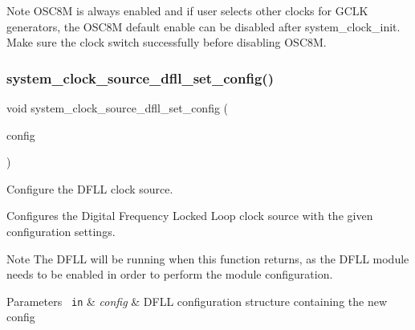 \begin{DoxyNote}{Note}
O\+S\+C8M is always enabled and if user selects other clocks for G\+C\+LK generators, the O\+S\+C8M default enable can be disabled after system\+\_\+clock\+\_\+init. Make sure the clock switch successfully before disabling O\+S\+C8M. 
\end{DoxyNote}
\mbox{\label{group__asfdoc__sam0__system__clock__group_gaa15073d0d4bd347bf8855ac20fd1b93c}} 
\subsubsection{\texorpdfstring{system\_clock\_source\_dfll\_set\_config()}{system\_clock\_source\_dfll\_set\_config()}}
{\footnotesize\ttfamily void system\+\_\+clock\+\_\+source\+\_\+dfll\+\_\+set\+\_\+config (\begin{DoxyParamCaption}\item[{struct \mbox{\hyperlink{structsystem__clock__source__dfll__config}{system\+\_\+clock\+\_\+source\+\_\+dfll\+\_\+config}} $\ast$const}]{config }\end{DoxyParamCaption})}



Configure the D\+F\+LL clock source. 

Configures the Digital Frequency Locked Loop clock source with the given configuration settings.

\begin{DoxyNote}{Note}
The D\+F\+LL will be running when this function returns, as the D\+F\+LL module needs to be enabled in order to perform the module configuration.
\end{DoxyNote}

\begin{DoxyParams}[1]{Parameters}
\mbox{\texttt{ in}}  & {\em config} & D\+F\+LL configuration structure containing the new config \\
\hline
\end{DoxyParams}
\mbox{\label{group__asfdoc__sam0__system__clock__group_gacea9ce7a68fc3b0b2a46f3a8c3d6d89b}} 
